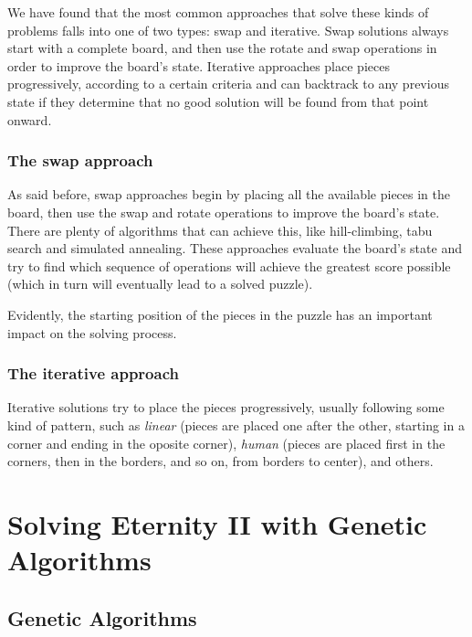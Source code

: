 \documentclass{llncs}
\begin{document}
We have found that the most common approaches that solve these kinds of problems falls into one of two types: swap and iterative. Swap solutions always start with a complete board, and then use the rotate and swap operations in order to improve the board's state. Iterative approaches place pieces progressively, according to a certain criteria and can backtrack to any previous state if they determine that no good solution will be found from that point onward.

\subsubsection{The swap approach}\label{sec:swap_approach}

As said before, swap approaches begin by placing all the available pieces in the board, then use the swap and rotate operations to improve the board's state. There are plenty of algorithms that can achieve this, like hill-climbing, tabu search and simulated annealing. These approaches evaluate the board's state and try to find which sequence of operations will achieve the greatest score possible (which in turn will eventually lead to a solved puzzle).

Evidently, the starting position of the pieces in the puzzle has an important impact on the solving process.

\subsubsection{The iterative approach}\label{sec:iterative_approach}

Iterative solutions try to place the pieces progressively, usually following some kind of pattern, such as \textit{linear} (pieces are placed one after the other, starting in a corner and ending in the oposite corner), \textit{human} (pieces are placed first in the corners, then in the borders, and so on, from borders to center), and others.

\section{Solving Eternity II with Genetic Algorithms}\label{sec:genetic_algorithms}

\subsection{Genetic Algorithms}

\end{document}
